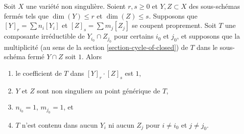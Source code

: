 \begin{lemma}
\label{lemma-transversal-subschemes}
Soit $X$ une variété non singulière. Soient $r, s \geq 0$ et
$Y, Z \subset X$ des sous-schémas fermés tels que $\dim(Y) \leq r$ et
$\dim(Z) \leq s$. Supposons que $[Y]_r = \sum n_i[Y_i]$ et
$[Z]_s = \sum m_j[Z_j]$ se coupent proprement.
Soit $T$ une composante irréductible de $Y_{i_0} \cap Z_{j_0}$
pour certains $i_0$ et $j_0$, et supposons que la multiplicité
(au sens de la section \ref{section-cycle-of-closed}) de $T$
dans le sous-schéma fermé $Y \cap Z$ soit $1$.
Alors
\begin{enumerate}
\item le coefficient de $T$ dans $[Y]_r \cdot [Z]_s$ est $1$,
\item $Y$ et $Z$ sont non singuliers au point générique de $T$,
\item $n_{i_0} = 1$, $m_{j_0} = 1$, et
\item $T$ n'est contenu dans aucun $Y_i$ ni aucun $Z_j$ pour $i \not = i_0$ et
$j \not = j_0$.
\end{enumerate}
\end{lemma}

